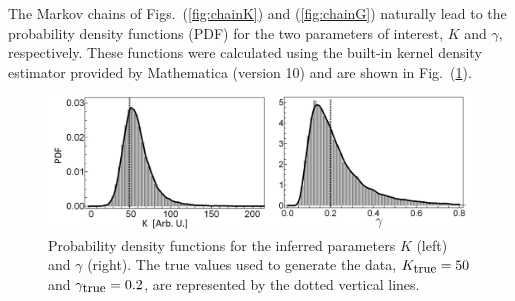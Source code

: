 \documentclass[12pt,a4paper,final]{iopart}
\begin{document}
%
The Markov chains of Figs.~(\ref{fig:chainK}) and (\ref{fig:chainG}) naturally lead to the probability density functions (PDF) for the two parameters of interest, $K$ and $\gamma$, respectively. These functions were calculated using the built-in kernel density estimator provided by Mathematica (version 10) and are shown in Fig.~(\ref{fig:KG_distr}).
\begin{figure}[htb!]
    \centering
    \includegraphics[width=1.0\textwidth]{Figs/FigKg.png}
    \caption{Probability density functions for the inferred parameters $K$ (left) and $\gamma$ (right). The true values used to generate the data, $K_{\mbox{\small true}}=50$ and $\gamma_{\mbox{\small true}}=0.2$, are represented by the dotted vertical lines.}
    \label{fig:KG_distr}
\end{figure}
\end{document}
